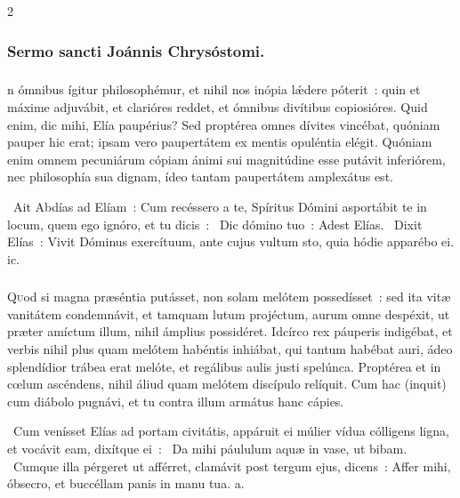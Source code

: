 \documentclass[9pt,twoside]{extarticle}
\begin{document}
\begin{multicols}{2}
{\subsubsection*{\center Sermo sancti Joánnis Chrysóstomi.}
\subsubsection*{\center {}}
n ómnibus ígitur philosophémur, et nihil nos inópia lǽdere póterit~: quin et máxime adjuvábit, et clarióres reddet, et ómnibus divítibus copiosióres. Quid enim, dic mihi, Elía paupérius? Sed proptérea omnes dívites vincébat, quóniam pauper hic erat; ipsam vero paupertátem ex mentis opuléntia elégit. Quóniam enim omnem pecuniárum cópiam ánimi sui magnitúdine esse putávit inferiórem, nec philosophía sua dignam, ídeo tantam paupertátem amplexátus est.

\begin{tightlist}{}
\item {}~Ait Abdías ad Elíam~: Cum recéssero a te, Spíritus Dómini asportábit te in locum, quem ego ignóro, et tu dicis~: \textred{*}~Dic dómino tuo~: Adest Elías. ~Dixit Elías~: Vivit Dóminus exercítuum, ante cujus vultum sto, quia hódie apparébo ei. ic.
\end{tightlist}

\subsubsection*{\center {}}
\lettrine{Q}uod si magna præséntia putásset, non solam melótem possedísset~: sed ita vitæ vanitátem condemnávit, et tamquam lutum projéctum, aurum omne despéxit, ut præter amíctum illum, nihil ámplius possidéret. Idcírco rex páuperis indigébat, et verbis nihil plus quam melótem habéntis inhiábat, qui tantum habébat auri, ádeo splendídior trábea erat melóte, et regálibus aulis justi spelúnca. Proptérea et in cœlum ascéndens, nihil áliud quam melótem discípulo relíquit. Cum hac (inquit) cum diábolo pugnávi, et tu contra illum armátus hanc cápies.

\begin{tightlist}{}
\item {}~Cum venísset Elías ad portam civitátis, appáruit ei múlier vídua cólligens ligna, et vocávit eam, dixítque ei~: \textred{*}~Da mihi páululum aquæ in vase, ut bibam. ~Cumque illa pérgeret ut afférret, clamávit post tergum ejus, dicens~: Affer mihi, óbsecro, et buccéllam panis in manu tua. a.
\end{tightlist}

}
\end{multicols}
\end{document}
